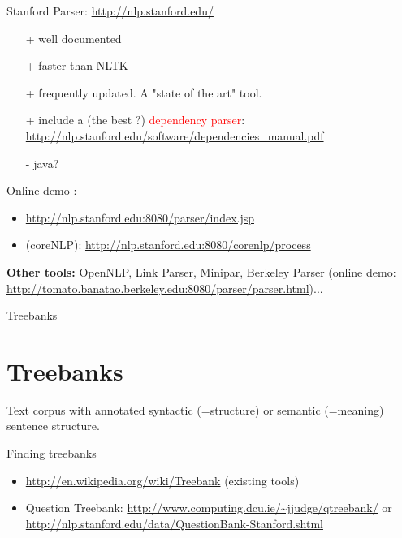 \documentclass[10pt]{beamer}
\begin{document}

\begin{frame}

\begin{exampleblock}{Stanford Parser: \url{http://nlp.stanford.edu/}}
	\begin{itemize}
		\item[+] well documented
		\item[+] faster than NLTK
		\item[+] frequently updated. A "state of the art" tool.
		\item[+] include a (the best ?) \textcolor{red}{dependency parser}: \url{http://nlp.stanford.edu/software/dependencies_manual.pdf}
		\item[-] java?
	\end{itemize}
	
Online demo : 
	\begin{itemize}
		\item \url{http://nlp.stanford.edu:8080/parser/index.jsp}
		\item (coreNLP): \url{http://nlp.stanford.edu:8080/corenlp/process}
	\end{itemize}
\end{exampleblock}

\textbf{Other tools:} OpenNLP, Link Parser, Minipar, Berkeley Parser (online demo: \url{http://tomato.banatao.berkeley.edu:8080/parser/parser.html})...

\end{frame}


\begin{frame}{Treebanks}

\section{Treebanks}

Text corpus with annotated syntactic (=structure) or semantic (=meaning) sentence structure.

\begin{exampleblock}{Finding treebanks}
	\begin{itemize}
		\item \url{http://en.wikipedia.org/wiki/Treebank} (existing tools)
		\item Question Treebank: \url{http://www.computing.dcu.ie/~jjudge/qtreebank/} or \url{http://nlp.stanford.edu/data/QuestionBank-Stanford.shtml}
	\end{itemize}
\end{exampleblock}

\end{frame}
\end{document}
